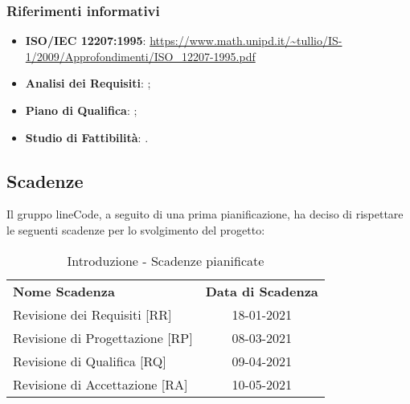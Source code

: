 	\subsubsection{Riferimenti informativi}
	\begin{itemize}
		\item \textbf{ISO/IEC 12207:1995}: \url{https://www.math.unipd.it/~tullio/IS-1/2009/Approfondimenti/ISO_12207-1995.pdf}
		\item \textbf{Analisi dei Requisiti}: ;
		\item \textbf{Piano di Qualifica}: ;
		\item \textbf{Studio di Fattibilità}: .
	\end{itemize}

\subsection{Scadenze}
	Il gruppo lineCode, a seguito di una prima pianificazione, ha deciso di rispettare le seguenti scadenze per lo svolgimento del progetto:
	\begin{table} [h!]
		\begin{center}
			\begin{tabular} { m{5.5cm} c }
				\rowcolor{lightgray}
				\textbf{Nome Scadenza} & \textbf{Data di Scadenza} \\ 
				Revisione dei Requisiti [RR] & 18-01-2021 \\ 
				Revisione di Progettazione [RP] & 08-03-2021 \\ 
				Revisione di Qualifica [RQ] & 09-04-2021 \\ 
				Revisione di Accettazione [RA] & 10-05-2021 \\
			\end{tabular}
			\caption{Introduzione - Scadenze pianificate}
		\end{center}
	\end{table}
